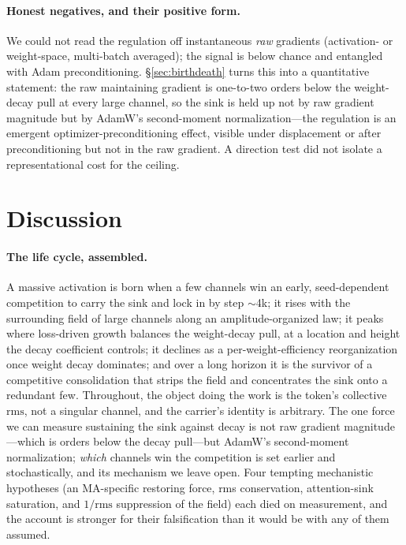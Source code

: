 \documentclass[11pt]{article}
\newcommand{\rms}{\mathrm{rms}}
\begin{document}
\paragraph{Honest negatives, and their positive form.} We could not read the
regulation off instantaneous \emph{raw} gradients (activation- or weight-space,
multi-batch averaged); the signal is below chance and entangled with Adam
preconditioning. \S\ref{sec:birthdeath} turns this into a quantitative statement: the
raw maintaining gradient is one-to-two orders below the weight-decay pull at every
large channel, so the sink is held up not by raw gradient magnitude but by AdamW's
second-moment normalization---the regulation is an emergent optimizer-preconditioning
effect, visible under displacement or after preconditioning but not in the raw
gradient. A direction test did not isolate a representational cost for the ceiling.

\section{Discussion}
\paragraph{The life cycle, assembled.} A massive activation is born when a few
channels win an early, seed-dependent competition to carry the sink and lock in by
step $\sim$4k; it rises with the surrounding field of large channels along an
amplitude-organized law; it peaks where loss-driven growth balances the weight-decay
pull, at a location and height the decay coefficient controls; it declines as a
per-weight-efficiency reorganization once weight decay dominates; and over a long
horizon it is the survivor of a competitive consolidation that strips the field and
concentrates the sink onto a redundant few. Throughout, the object doing the work is
the token's collective $\rms$, not a singular channel, and the carrier's identity is
arbitrary. The one force we can measure sustaining the sink against decay is not raw
gradient magnitude---which is orders below the decay pull---but AdamW's second-moment
normalization; \emph{which} channels win the competition is set earlier and
stochastically, and its mechanism we leave open. Four tempting mechanistic
hypotheses (an MA-specific restoring force, rms conservation, attention-sink
saturation, and $1/\rms$ suppression of the field) each died on measurement, and the
account is stronger for their falsification than it would be with any of them assumed.
\end{document}
